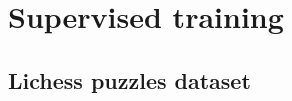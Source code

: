 \section{Supervised training}
\label{sec:supervised training}


\subsection{Lichess puzzles dataset}
